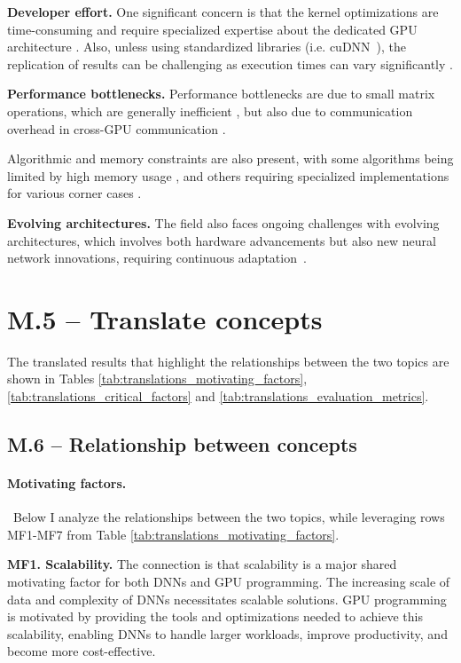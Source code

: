 \textbf{Developer effort.}
One significant concern is that the kernel optimizations are time-consuming and require specialized
expertise about the dedicated GPU architecture . Also, unless using standardized
libraries (i.e. cuDNN~\cite{chetlur_cudnn_2014}), the replication of results can be challenging as
execution times can vary significantly .

\textbf{Performance bottlenecks.}
Performance bottlenecks are due to small matrix operations, which are generally inefficient ,
but also due to communication overhead in cross-GPU communication .

Algorithmic and memory constraints are also present, with some algorithms being limited by high
memory usage , and others requiring specialized implementations for various corner
cases .

\textbf{Evolving architectures.}
The field also faces ongoing challenges with evolving architectures, which involves both hardware advancements
but also new neural network innovations, requiring continuous adaptation~.

\section{M.5 -- Translate concepts}
\label{sec:translate-concepts}
The translated results that highlight the relationships between the two topics are shown in Tables
\ref{tab:translations_motivating_factors}, \ref{tab:translations_critical_factors} and
\ref{tab:translations_evaluation_metrics}.

\subsection{M.6 -- Relationship between concepts}

\paragraph{Motivating factors.}\
Below I analyze the relationships between the two topics, while leveraging rows MF1-MF7 from Table
\ref{tab:translations_motivating_factors}.

\textbf{MF1. Scalability.}
The connection is that scalability is a major shared motivating factor for both DNNs and GPU programming.
The increasing scale of data and complexity of DNNs necessitates scalable solutions. GPU programming is
motivated by providing the tools and optimizations needed to achieve this scalability, enabling DNNs to
handle larger workloads, improve productivity, and become more cost-effective.

